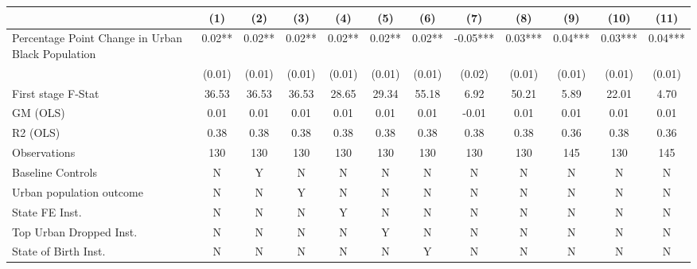  \begin{tabular}{l*{11}{c}} \toprule
                    &\multicolumn{1}{c}{(1)}   &\multicolumn{1}{c}{(2)}   &\multicolumn{1}{c}{(3)}   &\multicolumn{1}{c}{(4)}   &\multicolumn{1}{c}{(5)}   &\multicolumn{1}{c}{(6)}   &\multicolumn{1}{c}{(7)}   &\multicolumn{1}{c}{(8)}   &\multicolumn{1}{c}{(9)}   &\multicolumn{1}{c}{(10)}   &\multicolumn{1}{c}{(11)}   \\
\midrule
Percentage Point Change in Urban Black Population&     0.02** &     0.02** &     0.02** &     0.02** &     0.02** &     0.02** &    -0.05***&     0.03***&     0.04***&     0.03***&     0.04***\\
                    &   (0.01)   &   (0.01)   &   (0.01)   &   (0.01)   &   (0.01)   &   (0.01)   &   (0.02)   &   (0.01)   &   (0.01)   &   (0.01)   &   (0.01)   \\
\midrule
First stage F-Stat  &    36.53   &    36.53   &    36.53   &    28.65   &    29.34   &    55.18   &     6.92   &    50.21   &     5.89   &    22.01   &     4.70   \\
GM (OLS)            &     0.01   &     0.01   &     0.01   &     0.01   &     0.01   &     0.01   &    -0.01   &     0.01   &     0.01   &     0.01   &     0.01   \\
R2 (OLS)            &     0.38   &     0.38   &     0.38   &     0.38   &     0.38   &     0.38   &     0.38   &     0.38   &     0.36   &     0.38   &     0.36   \\
Observations        &      130   &      130   &      130   &      130   &      130   &      130   &      130   &      130   &      145   &      130   &      145   \\
Baseline Controls   &        N   &        Y   &        N   &        N   &        N   &        N   &        N   &        N   &        N   &        N   &        N   \\
Urban population outcome&        N   &        N   &        Y   &        N   &        N   &        N   &        N   &        N   &        N   &        N   &        N   \\
State FE Inst.      &        N   &        N   &        N   &        Y   &        N   &        N   &        N   &        N   &        N   &        N   &        N   \\
Top Urban Dropped Inst.&        N   &        N   &        N   &        N   &        Y   &        N   &        N   &        N   &        N   &        N   &        N   \\
State of Birth Inst.&        N   &        N   &        N   &        N   &        N   &        Y   &        N   &        N   &        N   &        N   &        N   \\

\end{tabular}
